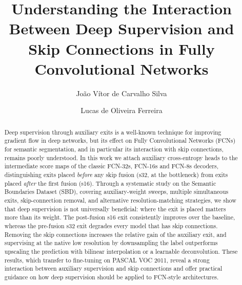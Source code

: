 \documentclass[runningheads]{llncs}
\begin{document}
%
\title{Understanding the Interaction Between Deep Supervision and Skip Connections in Fully Convolutional Networks}
%
%
\author{João Vítor de Carvalho Silva \and
Lucas de Oliveira Ferreira}
%


%
%
\maketitle              %
%
\begin{abstract}
Deep supervision through auxiliary exits is a well-known technique for improving
gradient flow in deep networks, but its effect on Fully Convolutional Networks
(FCNs) for semantic segmentation, and in particular its interaction with skip
connections, remains poorly understood. In this work we attach auxiliary
cross-entropy heads to the intermediate score maps of the classic FCN-32s,
FCN-16s and FCN-8s decoders, distinguishing exits placed \emph{before} any skip
fusion (s32, at the bottleneck) from exits placed \emph{after} the first fusion
(s16). Through a systematic study on the Semantic Boundaries Dataset (SBD),
covering auxiliary-weight sweeps, multiple simultaneous exits, skip-connection
removal, and alternative resolution-matching strategies, we show that deep
supervision is not universally beneficial: where the exit is placed matters more
than its weight. The post-fusion s16 exit consistently improves over the
baseline, whereas the pre-fusion s32 exit degrades every model that has skip
connections. Removing the skip connections increases the relative gain of the
auxiliary exit, and supervising at the native low resolution by downsampling the
label outperforms upscaling the prediction with bilinear interpolation or a
learnable deconvolution. These results, which transfer to fine-tuning on PASCAL
VOC 2011, reveal a strong interaction between auxiliary supervision and skip
connections and offer practical guidance on how deep supervision should be
applied to FCN-style architectures.

\end{abstract}
%
%
%
\end{document}
